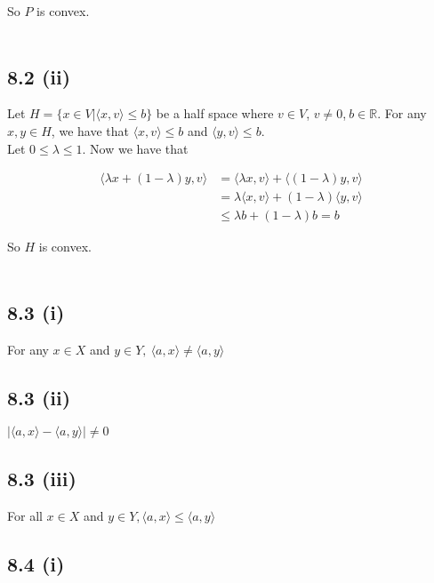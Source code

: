\documentclass[letterpaper,12pt]{article}
\theoremstyle{definition}
\begin{document}
So $P$ is convex.
\\ \\

\subsection*{8.2 (ii)}


Let $H=\{ x \in V | \langle x, v \rangle \leq b \}$ be a half space where $v \in V$, $v \neq 0$,$~b \in \mathds{R}$. For any $x,y \in H$, we have that $\langle x,v \rangle \leq b$ and $\langle y,v \rangle \leq b$. \\
Let $ 0 \leq \lambda \leq 1$. Now we have that 

\begin{align*}
\langle \lambda x + (1-\lambda)y,v \rangle &= \langle \lambda x, v \rangle + \langle (1-\lambda)y, v \rangle \\
 &= \lambda \langle x,v \rangle + (1-\lambda)\langle y,v \rangle \\
 &\leq \lambda b + (1-\lambda)b = b 
\end{align*}

So $H$ is convex.
\\ \\

\subsection*{8.3 (i)}


For any $x \in  X$ and $y \in Y, ~ \langle a, x \rangle \neq \langle a, y \rangle$
\subsection*{8.3 (ii)}


$| \langle a, x\rangle - \langle a, y \rangle| \neq 0$

\subsection*{8.3 (iii)}


For all $x \in  X$ and $y \in Y,   \langle a, x \rangle \leq \langle a, y \rangle$


\subsection*{8.4 (i)}
\end{document}
